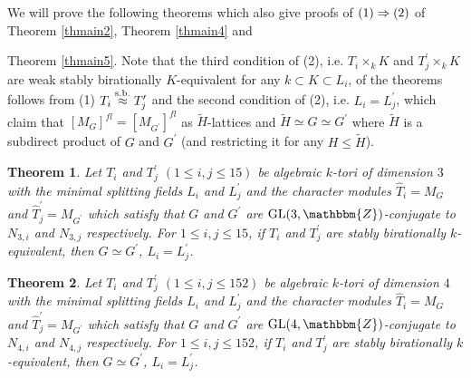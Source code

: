\documentclass{amsart}
\theoremstyle{plain}
\newtheorem{theorem}{Theorem}[section]
\theoremstyle{definition}
\theoremstyle{remark}
\newcommand{\bZ}{\mathbbm{Z}}\newcommand{\bQ}{\mathbbm{Q}}
\newcommand{\GL}{{\rm GL}}\newcommand{\SL}{{\rm SL}}
\newcounter{sub}\def\tr{\mbox{tr }}
\begin{document}
We will prove the following theorems 
which also give proofs of 
${\rm (1)}\Rightarrow {\rm (2)}$ of {Theorem \ref{thmain2}}, {Theorem \ref{thmain4}} and {Theorem \ref{thmain5}. 
Note that the third condition of {\rm (2)}, i.e. 
$T_i\times_k K$ and $T_j^\prime\times_k K$ 
are weak stably birationally $K$-equivalent 
for any $k\subset K\subset L_i$, of the theorems 
follows from {\rm (1)} $T_i\stackrel{\rm s.b.}{\approx} T_j^\prime$ 
and the second condition of {\rm (2)}, i.e. $L_i=L_j^\prime$, 
which claim that $[M_G]^{fl}=[M_{G^\prime}]^{fl}$ as $\widetilde{H}$-lattices 
and $\widetilde{H}\simeq G\simeq G^\prime$ 
where $\widetilde{H}$ is a subdirect product of $G$ and $G^\prime$ 
(and restricting it for any $H\leq \widetilde{H}$). 

\begin{theorem}\label{th8.1}
Let $T_i$ and $T_j^\prime$ $(1\leq i,j\leq 15)$ 
be algebraic $k$-tori of dimension $3$ 
with the minimal splitting fields $L_i$ and $L^\prime_j$ 
and the character modules 
$\widehat{T}_i=M_G$ and $\widehat{T}^\prime_j=M_{G^\prime}$ 
which satisfy that 
$G$ and $G^\prime$ are 
$\GL(3,\bZ)$-conjugate to $N_{3,i}$ and $N_{3,j}$ respectively. 
For $1\leq i,j\leq 15$, 
if $T_i$ and $T_j^\prime$ are stably birationally $k$-equivalent, then 
$G\simeq G^\prime$, $L_i=L_j^\prime$.
\end{theorem}

\begin{theorem}\label{th8.2}
Let $T_i$ and $T_j^\prime$ $(1\leq i,j\leq 152)$ 
be algebraic $k$-tori of dimension $4$ 
with the minimal splitting fields $L_i$ and $L^\prime_j$ 
and the character modules 
$\widehat{T}_i=M_G$ and $\widehat{T}^\prime_j=M_{G^\prime}$ 
which satisfy that 
$G$ and $G^\prime$ are 
$\GL(4,\bZ)$-conjugate to $N_{4,i}$ and $N_{4,j}$ respectively. 
For $1\leq i,j\leq 152$, 
if $T_i$ and $T_j^\prime$ are stably birationally $k$-equivalent, then 
$G\simeq G^\prime$, $L_i=L_j^\prime$.
\end{theorem}

}
\end{document}
